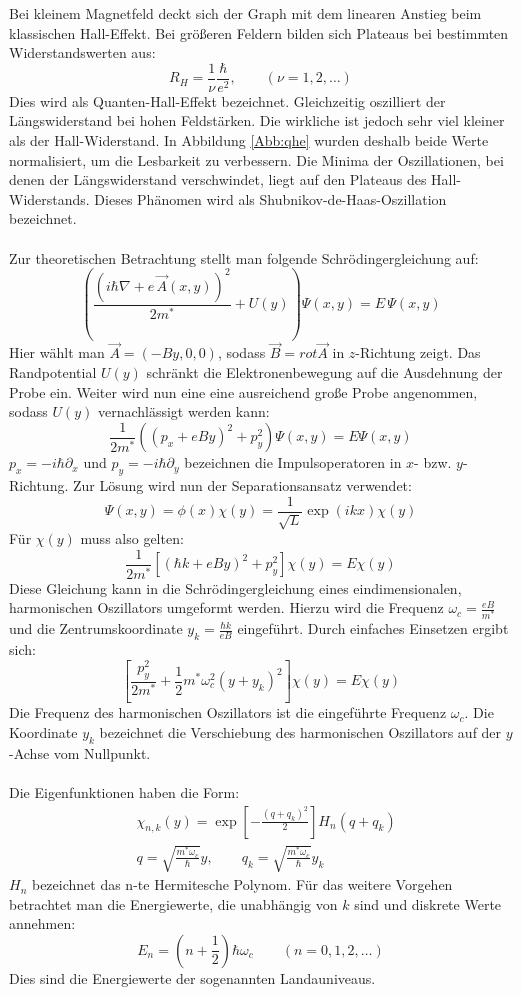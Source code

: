 Bei kleinem Magnetfeld deckt sich der Graph mit dem linearen Anstieg beim
klassischen Hall-Effekt. Bei größeren Feldern bilden sich Plateaus bei bestimmten 
Widerstandswerten aus:
\[
	R_{H} = \frac{1}{\nu} \frac{\hbar}{e^{2}}, \qquad (\nu=1,2,\dots)
\]
Dies wird als Quanten-Hall-Effekt bezeichnet.
Gleichzeitig oszilliert der Längswiderstand bei hohen Feldstärken. Die wirkliche
ist jedoch sehr viel kleiner als der Hall-Widerstand. In Abbildung \ref{Abb:qhe}
wurden deshalb beide Werte normalisiert, um die Lesbarkeit zu verbessern. 
Die Minima der Oszillationen, bei denen der Längswiderstand verschwindet, liegt auf
den Plateaus des Hall-Widerstands. Dieses Phänomen wird als
Shubnikov-de-Haas-Oszillation bezeichnet.\\\\
Zur theoretischen Betrachtung stellt man folgende Schrödingergleichung auf:
\[
	\left(
		\frac{( i\hbar\nabla+e \, \vec{A}(x,y) )^{2}}{2m^{*}} + U(y)
	\right) \Psi(x,y) = E \, \Psi(x,y)
\]
Hier wählt man $\vec{A} = (-By,0,0)$, sodass $\vec{B} = rot \vec{A}$ in $z$-Richtung
zeigt. Das Randpotential $U(y)$ schränkt die Elektronenbewegung auf die Ausdehnung
der Probe ein.
Weiter wird nun eine eine ausreichend große Probe angenommen, sodass $U(y)$ 
vernachlässigt werden kann:
\newcommand{\zweim}{\frac{1}{2m^{*}}}
\[{}
	\zweim \left( (p_{x} + e B y)^{2} + p_{y}^{2}\right) \Psi(x,y) = E \Psi(x,y)
\]
$p_{x} = - i \hbar \partial_{x}$ und $p_{y} = - i \hbar \partial_{y}$ bezeichnen die
Impulsoperatoren in $x$- bzw. $y$-Richtung.
Zur Lösung wird nun der Separationsansatz verwendet:
\[
	\Psi(x,y) = \phi(x) \chi(y) = \frac{1}{\sqrt{L}} \exp(ikx) \chi(y)
\]
Für $\chi(y)$ muss also gelten:
\[
	\zweim \left[ (\hbar k + eBy)^{2} + p_{y}^{2} \right] \chi(y) = E \chi(y)
\]
Diese Gleichung kann in die Schrödingergleichung eines eindimensionalen,
harmonischen Oszillators umgeformt werden. Hierzu wird die Frequenz
$\omega_{c} = \frac{e B}{m^{*}}$ und die Zentrumskoordinate 
$y_{k} = \frac{\hbar k}{eB}$ eingeführt. Durch einfaches Einsetzen ergibt sich:
\[
	\left[ \frac{p_{y}^{2}}{2m^{*}} + \frac{1}{2} m^{*} \omega_{c}^{2}
	(y + y_{k})^{2} \right] \chi(y) = E \chi(y)
\]
Die Frequenz des harmonischen Oszillators ist die eingeführte Frequenz $\omega_{c}$.
Die Koordinate $y_{k}$ bezeichnet die Verschiebung des harmonischen Oszillators auf
der $y$-Achse vom Nullpunkt.\\\\
Die Eigenfunktionen haben die Form:
\begin{align*}
    &\chi_{n,k}(y) = \exp \left[ - \frac{(q+q_{k})^{2}}{2} \right]
                    H_{n} (q+q_{k})\\
    &q = \sqrt{\frac{m^{*} \omega_{c}}{\hbar}} y, \qquad 
     q_{k} = \sqrt{\frac{m^{*}\omega_{c}}{\hbar}}y_{k}
\end{align*}
$H_{n}$ bezeichnet das n-te Hermitesche Polynom. Für das weitere Vorgehen betrachtet
man die Energiewerte, die unabhängig von $k$ sind und diskrete Werte annehmen:
\[
    E_{n} = \left(n + \frac{1}{2}\right) \hbar \omega_{c}
    \qquad (n=0,1,2,\dots)
\]
Dies sind die Energiewerte der sogenannten Landauniveaus. 

